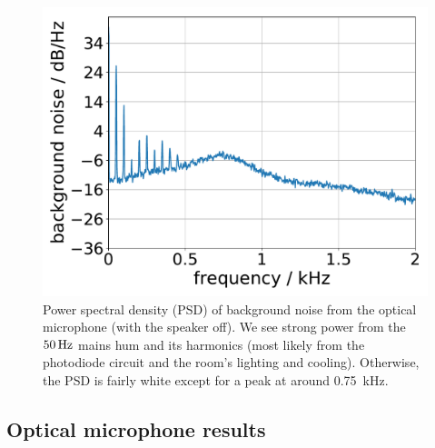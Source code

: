\documentclass[paper-main.tex]{subfiles}
\begin{document}
\begin{figure}
	\includegraphics[width=.5\textwidth]{figures/psd_podo_14_6.pdf}
	\caption{\label{fig:psd_noise}
Power spectral density (PSD) of background noise from the optical microphone (with the speaker off). 
We see strong power from the $50\,{\rm Hz}$ mains hum and its harmonics (most likely from the photodiode circuit and the room’s lighting and cooling). Otherwise, the PSD is fairly white except for a peak at around 0.75~kHz. 
}
\end{figure}


\subsection{Optical microphone results}
\label{sec:opticalMicResults}
\end{document}
